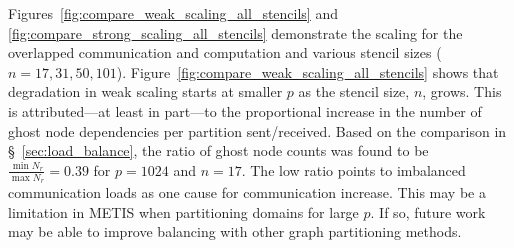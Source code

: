 \documentclass{report}
\begin{document}
Figures~\ref{fig:compare_weak_scaling_all_stencils} and \ref{fig:compare_strong_scaling_all_stencils} demonstrate the scaling for the overlapped communication and computation and various stencil sizes ($n=17,31,50,101$). Figure~\ref{fig:compare_weak_scaling_all_stencils} shows that degradation in weak scaling starts at smaller $p$ as the stencil size, $n$, grows. This is attributed---at least in part---to the proportional increase in the number of ghost node dependencies per partition sent/received. Based on the comparison in \S~\ref{sec:load_balance}, the ratio of ghost node counts was found to be $\frac{\min N_r}{\max N_r} = 0.39$ for $p=1024$ and $n=17$. The low ratio points to imbalanced communication loads as one cause for communication increase. 
This may be a limitation in METIS when partitioning domains for large $p$. If so, future work may be able to improve balancing with other graph partitioning methods. 
\end{document}
